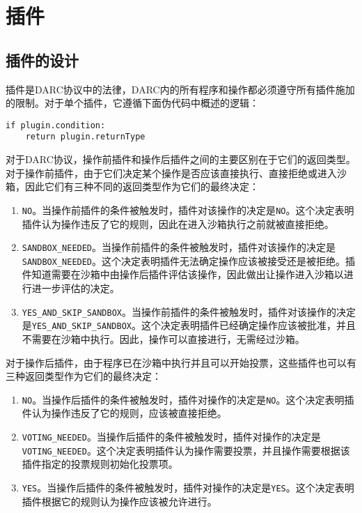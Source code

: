 \documentclass[main.tex]{subfiles}
\begin{document}
\section{插件}

\subsection{插件的设计}

插件是DARC协议中的法律，DARC内的所有程序和操作都必须遵守所有插件施加的限制。对于单个插件，它遵循下面伪代码中概述的逻辑：

\begin{verbatim}
if plugin.condition:
    return plugin.returnType
\end{verbatim}

对于DARC协议，操作前插件和操作后插件之间的主要区别在于它们的返回类型。对于操作前插件，由于它们决定某个操作是否应该直接执行、直接拒绝或进入沙箱，因此它们有三种不同的返回类型作为它们的最终决定：

\begin{enumerate}
    \item \texttt{NO}。当操作前插件的条件被触发时，插件对该操作的决定是\texttt{NO}。这个决定表明插件认为操作违反了它的规则，因此在进入沙箱执行之前就被直接拒绝。

    \item \texttt{SANDBOX\_NEEDED}。当操作前插件的条件被触发时，插件对该操作的决定是\texttt{SANDBOX\_NEEDED}。这个决定表明插件无法确定操作应该被接受还是被拒绝。插件知道需要在沙箱中由操作后插件评估该操作，因此做出让操作进入沙箱以进行进一步评估的决定。

    \item \texttt{YES\_AND\_SKIP\_SANDBOX}。当操作前插件的条件被触发时，插件对该操作的决定是\texttt{YES\_AND\_SKIP\_SANDBOX}。这个决定表明插件已经确定操作应该被批准，并且不需要在沙箱中执行。因此，操作可以直接进行，无需经过沙箱。
\end{enumerate}



对于操作后插件，由于程序已在沙箱中执行并且可以开始投票，这些插件也可以有三种返回类型作为它们的最终决定：

\begin{enumerate}
    \item \texttt{NO}。当操作后插件的条件被触发时，插件对操作的决定是\texttt{NO}。这个决定表明插件认为操作违反了它的规则，应该被直接拒绝。

    \item \texttt{VOTING\_NEEDED}。当操作后插件的条件被触发时，插件对操作的决定是\texttt{VOTING\_NEEDED}。这个决定表明插件认为操作需要投票，并且操作需要根据该插件指定的投票规则初始化投票项。

    \item \texttt{YES}。当操作后插件的条件被触发时，插件对操作的决定是\texttt{YES}。这个决定表明插件根据它的规则认为操作应该被允许进行。
\end{enumerate}
\end{document}
